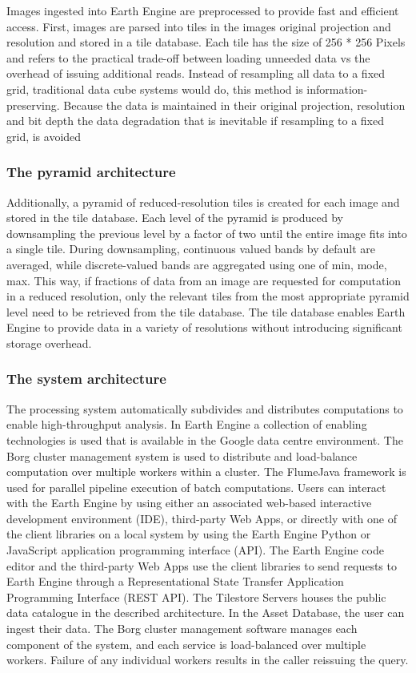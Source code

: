 Images ingested into Earth Engine are preprocessed to provide fast and efficient access. First, images are parsed into tiles in the images original projection and resolution and stored in a tile database. Each tile has the size of 256 * 256 Pixels and refers to the practical trade-off between loading unneeded data vs the overhead of issuing additional reads. Instead of resampling all data to a fixed grid, traditional data cube systems would do, this method is information-preserving. Because the data is maintained in their original projection, resolution and bit depth the data degradation that is inevitable if resampling to a fixed grid, is avoided

\subsubsection{The pyramid architecture}

Additionally, a pyramid of reduced-resolution tiles is created for each image and stored in the tile database. Each level of the pyramid is produced by downsampling the previous level by a factor of two until the entire image fits into a single tile. During downsampling, continuous valued bands by default are averaged, while discrete-valued bands are aggregated using one of min, mode, max. This way, if fractions of data from an image are requested for computation in a reduced resolution, only the relevant tiles from the most appropriate pyramid level need to be retrieved from the tile database. The tile database enables Earth Engine to provide data in a variety of resolutions without introducing significant storage overhead.

\subsubsection{The system architecture}

The processing system automatically subdivides and distributes computations to enable high-throughput analysis. In Earth Engine a collection of enabling technologies is used that is available in the Google data centre environment. The Borg cluster management system is used to distribute and load-balance computation over multiple workers within a cluster. The FlumeJava framework is used for parallel pipeline execution of batch computations.
Users can interact with the Earth Engine by using either an associated web-based interactive development environment (IDE), third-party Web Apps, or directly with one of the client libraries on a local system by using the Earth Engine Python or JavaScript application programming interface (API).
The Earth Engine code editor and the third-party Web Apps use the client libraries to send requests to Earth Engine through a Representational State Transfer Application Programming Interface (REST API). 
The Tilestore Servers houses the public data catalogue in the described architecture. In the Asset Database, the user can ingest their data. 
The Borg cluster management software manages each component of the system, and each service is load-balanced over multiple workers. Failure of any individual workers results in the caller reissuing the query.

